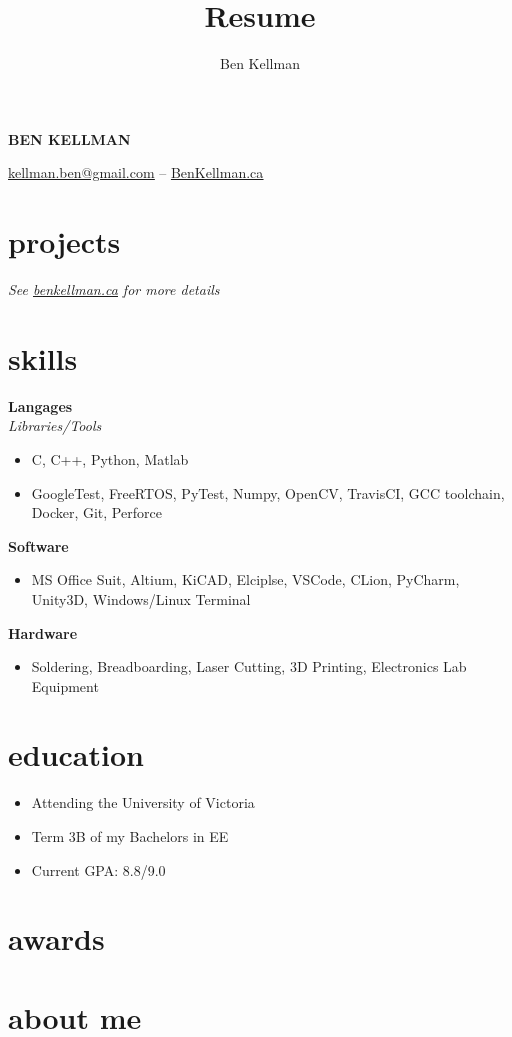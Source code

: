 \documentclass{article}
\author{Ben Kellman}
\title{Resume}
\newcommand{\minicolumns}[2]{
  \begin{minipage}[t]{0.25\textwidth}
    \begin{flushright}
      #1
    \end{flushright}
  \end{minipage}
  \hfill    
  \begin{minipage}[t]{0.7\textwidth}
    #2
  \end{minipage}   
}
\newcommand{\resumeSection}[3]{
  \minicolumns{
      \textbf{#1}\\          
      \textit{#2}
    }
    {  
      \begin{itemize}[leftmargin=*]
          \setlength\itemsep{-0.1em}
          #3
      \end{itemize}
  }
  \vspace{1em}
}
\begin{document}
\begin{center}
  {\bfseries \LARGE \MakeUppercase{Ben Kellman}}
  
  \vspace{0.75em}
  \underline{\href{mailto: kellman.ben@gmail.com}{kellman.ben@gmail.com}} -- \underline{\href{www.BenKellman.ca}{BenKellman.ca}}

\end{center}
\vspace{1em}

\begin{minipage}[t]{0.65\textwidth}
  \section{projects}
  
  
  \textit{See \underline{\href{www.benkellman.ca}{benkellman.ca}} for more details}

  \section{skills}
  \resumeSection{Langages}{Libraries/Tools}{
    \item C, C++, Python, Matlab
    \item GoogleTest, FreeRTOS, PyTest, Numpy, OpenCV, TravisCI, GCC toolchain, Docker, Git, Perforce
  }

  \resumeSection{Software}{}{
    \item MS Office Suit, Altium, KiCAD, Elciplse, VSCode, CLion, PyCharm, Unity3D, Windows/Linux Terminal
    }

  \resumeSection{Hardware}{}{
    \item Soldering, Breadboarding, Laser Cutting, 3D Printing, Electronics Lab Equipment
  }
\end{minipage}
\begin{minipage}[t]{0.34\textwidth}
  \section{education}
  \begin{itemize}
    \setlength\itemsep{-0.1em}
    \item Attending the University of Victoria
    \item Term 3B of my Bachelors in EE
    \item Current GPA: 8.8/9.0
  \end{itemize}

  \section{awards}
  \section{about me}
\end{minipage}
\end{document}

